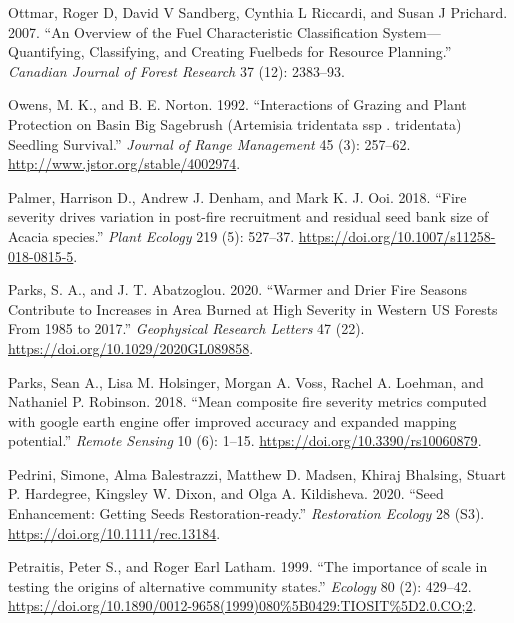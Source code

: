 \documentclass[
  12pt,
]{article}
\newlength{\cslhangindent}
\newlength{\cslentryspacingunit} %
\newenvironment{CSLReferences}[2] %
 {%
  \setlength{\parindent}{0pt}
  \ifodd #1
  \let\oldpar\par
  \def\par{\hangindent=\cslhangindent\oldpar}
  \fi
  \setlength{\parskip}{#2\cslentryspacingunit}
 }%
 {}
\begin{document}
\begin{CSLReferences}{1}{0}
\leavevmode{}%
Ottmar, Roger D, David V Sandberg, Cynthia L Riccardi, and Susan J
Prichard. 2007. {``An Overview of the Fuel Characteristic Classification
System---Quantifying, Classifying, and Creating Fuelbeds for Resource
Planning.''} \emph{Canadian Journal of Forest Research} 37 (12):
2383--93.

\leavevmode{}%
Owens, M. K., and B. E. Norton. 1992. {``{Interactions of Grazing and
Plant Protection on Basin Big Sagebrush (Artemisia tridentata ssp .
tridentata) Seedling Survival}.''} \emph{Journal of Range Management} 45
(3): 257--62. \url{http://www.jstor.org/stable/4002974}.

\leavevmode{}%
Palmer, Harrison D., Andrew J. Denham, and Mark K. J. Ooi. 2018.
{``{Fire severity drives variation in post-fire recruitment and residual
seed bank size of Acacia species}.''} \emph{Plant Ecology} 219 (5):
527--37. \url{https://doi.org/10.1007/s11258-018-0815-5}.

\leavevmode{}%
Parks, S. A., and J. T. Abatzoglou. 2020. {``Warmer and {Drier} {Fire}
{Seasons} {Contribute} to {Increases} in {Area} {Burned} at {High}
{Severity} in {Western} {US} {Forests} {From} 1985 to 2017.''}
\emph{Geophysical Research Letters} 47 (22).
\url{https://doi.org/10.1029/2020GL089858}.

\leavevmode{}%
Parks, Sean A., Lisa M. Holsinger, Morgan A. Voss, Rachel A. Loehman,
and Nathaniel P. Robinson. 2018. {``{Mean composite fire severity
metrics computed with google earth engine offer improved accuracy and
expanded mapping potential}.''} \emph{Remote Sensing} 10 (6): 1--15.
\url{https://doi.org/10.3390/rs10060879}.

\leavevmode{}%
Pedrini, Simone, Alma Balestrazzi, Matthew D. Madsen, Khiraj Bhalsing,
Stuart P. Hardegree, Kingsley W. Dixon, and Olga A. Kildisheva. 2020.
{``Seed Enhancement: Getting Seeds Restoration‐ready.''}
\emph{Restoration Ecology} 28 (S3).
\url{https://doi.org/10.1111/rec.13184}.

\leavevmode{}%
Petraitis, Peter S., and Roger Earl Latham. 1999. {``{The importance of
scale in testing the origins of alternative community states}.''}
\emph{Ecology} 80 (2): 429--42.
\url{https://doi.org/10.1890/0012-9658(1999)080\%5B0429:TIOSIT\%5D2.0.CO;2}.


\end{CSLReferences}
\end{document}
